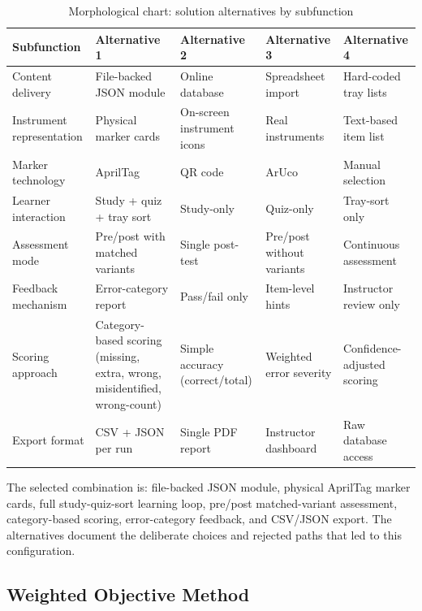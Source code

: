 \documentclass[10pt,a4paper]{article}
\begin{document}
\begin{table}[H]
\centering
\caption{Morphological chart: solution alternatives by subfunction}
\label{tab:morphological-chart}
\small\renewcommand{\arraystretch}{1.2}\setlength{\tabcolsep}{4pt}
\begin{tabularx}{\textwidth}{|>{\raggedright\arraybackslash}X|>{\raggedright\arraybackslash}X|>{\raggedright\arraybackslash}X|>{\raggedright\arraybackslash}X|>{\raggedright\arraybackslash}X|}
\hline
Subfunction & Alternative 1 & Alternative 2 & Alternative 3 & Alternative 4 \\
\hline
Content delivery & File-backed JSON module & Online database & Spreadsheet import & Hard-coded tray lists \\
\hline
Instrument representation & Physical marker cards & On-screen instrument icons & Real instruments & Text-based item list \\
\hline
Marker technology & AprilTag & QR code & ArUco & Manual selection \\
\hline
Learner interaction & Study + quiz + tray sort & Study-only & Quiz-only & Tray-sort only \\
\hline
Assessment mode & Pre/post with matched variants & Single post-test & Pre/post without variants & Continuous assessment \\
\hline
Feedback mechanism & Error-category report & Pass/fail only & Item-level hints & Instructor review only \\
\hline
Scoring approach & Category-based scoring (missing, extra, wrong, misidentified, wrong-count) & Simple accuracy (correct/total) & Weighted error severity & Confidence-adjusted scoring \\
\hline
Export format & CSV + JSON per run & Single PDF report & Instructor dashboard & Raw database access \\
\hline
\end{tabularx}
\end{table}

The selected combination is: file-backed JSON module, physical AprilTag marker
cards, full study-quiz-sort learning loop, pre/post matched-variant assessment,
category-based scoring, error-category feedback, and CSV/JSON export. The
alternatives document the deliberate choices and rejected paths that led to this
configuration.

\subsection{Weighted Objective Method}
\label{sec:weighted-objective-method}
\end{document}
